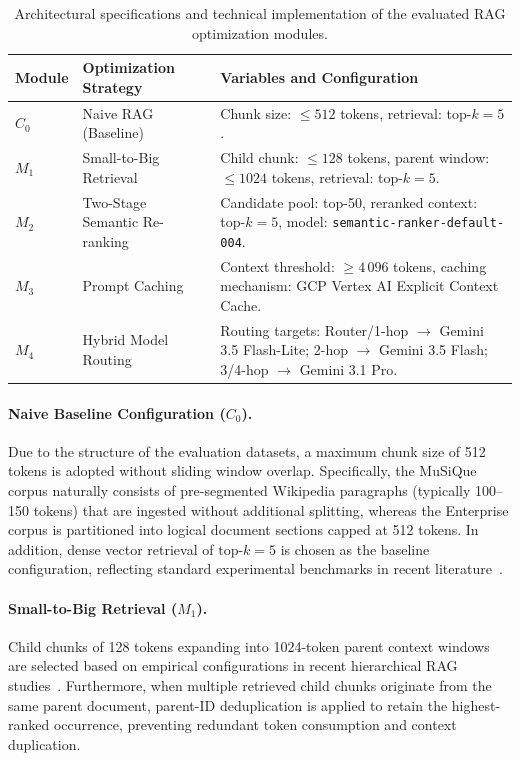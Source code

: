     \begin{table}[htbp]
    \centering
    \small
    \caption[Architectural specifications of optimization modules]{Architectural specifications and technical implementation of the evaluated RAG optimization modules.}
    \label{tab:optimization_modules}
    \begin{tabularx}{\textwidth}{l p{4.5cm} X}
    \toprule
    \textbf{Module} & \textbf{Optimization Strategy} & \textbf{Variables and Configuration}\\
    \midrule
    \textbf{$C_0$} & Naive RAG (Baseline)
      & Chunk size: $\le 512$ tokens, retrieval: top-$k = 5$.
      \\
    \addlinespace
    \textbf{$M_1$} & Small-to-Big Retrieval
      & Child chunk: $\le 128$ tokens, parent window: $\le 1024$ tokens, retrieval: top-$k = 5$.
      \\
    \addlinespace
    \textbf{$M_2$} & Two-Stage Semantic Re-ranking
      & Candidate pool: top-50, reranked context: top-$k = 5$, model: \texttt{semantic-ranker-default-004}.
      \\
    \addlinespace
    \textbf{$M_3$} & Prompt Caching
      & Context threshold: $\ge 4\,096$ tokens, caching mechanism: GCP Vertex AI Explicit Context Cache.
       \\
    \addlinespace
    \textbf{$M_4$} & Hybrid Model Routing
      & Routing targets: Router/1-hop $\to$ Gemini 3.5 Flash-Lite;  2-hop $\to$ Gemini 3.5 Flash; 3/4-hop $\to$ Gemini 3.1 Pro.
\\
    \bottomrule
    \end{tabularx}
    \end{table}

\paragraph{Naive Baseline Configuration ($C_0$).}
Due to the structure of the evaluation datasets, a maximum chunk size of 512 tokens is adopted without sliding window overlap. Specifically, the MuSiQue corpus naturally consists of pre-segmented Wikipedia paragraphs (typically 100--150 tokens) that are ingested without additional splitting, whereas the Enterprise corpus is partitioned into logical document sections capped at 512 tokens. In addition, dense vector retrieval of $\text{top-}k = 5$ is chosen as the baseline configuration, reflecting standard experimental benchmarks in recent literature~\citep{smigielski2026chunking, lewis2020rag}.

\paragraph{Small-to-Big Retrieval ($M_1$).}
Child chunks of 128 tokens expanding into 1024-token parent context windows are selected based on empirical configurations in recent hierarchical RAG studies~\citep{demourajunior2026adaptive, li2026bridgerag, lumer2025rethinking}. Furthermore, when multiple retrieved child chunks originate from the same parent document, parent-ID deduplication is applied to retain the highest-ranked occurrence, preventing redundant token consumption and context duplication.

